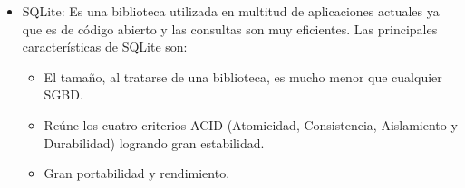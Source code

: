 \begin{itemize}
    \item SQLite: Es una biblioteca utilizada en multitud de aplicaciones actuales ya que es de código abierto y las consultas son muy eficientes. Las principales características de SQLite son:
    \begin{itemize}
        \item El tamaño, al tratarse de una biblioteca, es mucho menor que cualquier SGBD.
        \item Reúne los cuatro criterios ACID (Atomicidad, Consistencia, Aislamiento y Durabilidad) logrando gran estabilidad.
        \item Gran portabilidad y rendimiento.
    \end{itemize}
\end{itemize}